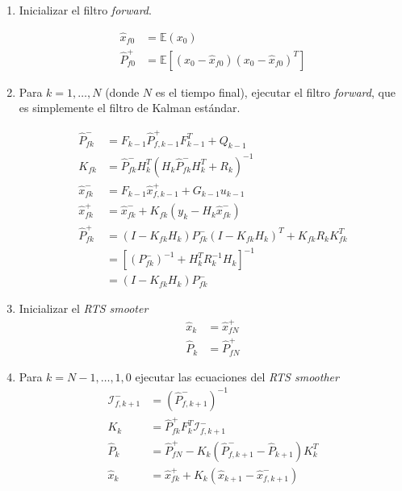 \begin{enumerate}
    \item Inicializar el filtro \textit{forward}.
    
    \[
    \begin{aligned}
    \hat{x}_{f0} &= \mathbb{E}(x_0) \\
    \hat{P}^{+}_{f0} &= \mathbb{E}\left[(x_0 - \hat{x}_{f0})(x_0 - \hat{x}_{f0})^{T}\right] 
    \end{aligned}
    \]
    
    \item Para \(k = 1, \dots, N\) (donde \(N\) es el tiempo final), ejecutar el filtro \textit{forward}, que es simplemente el filtro de Kalman estándar. 
    
    \[
    \begin{aligned}
    \hat{P}^{-}_{fk} &= F_{k-1}\hat{P}^{+}_{f,k-1}F_{k-1}^{T} + Q_{k-1} \\ 
    K_{fk} &= \hat{P}^{-}_{fk} H_k^{T} (H_k \hat{P}^{-}_{fk}H_k^{T} + R_k)^{-1}  \\
    \hat{x}^{-}_{fk} &= F_{k-1}\hat{x}^{+}_{f,k-1} + G_{k-1}u_{k-1} \\
    \hat{x}^{+}_{fk} &= \hat{x}^{-}_{fk} + K_{fk} \left(y_k - H_k \hat{x}^{-}_{fk} \right)\\ 
    \hat{P}^{+}_{fk} &= (I - K_{fk}H_k) P^{-}_{fk} (I-K_{fk}H_k)^{T} + K_{fk}R_{k}K_{fk}^{T} \\
    &= \left[ (P^{-}_{fk})^{-1} + H_k^{T} R_{k}^{-1}H_k\right]^{-1} \\ 
    &= (I - K_{fk}H_k)P^{-}_{fk}
    \end{aligned}
    \]
    
    \item Inicializar el \textit{RTS smooter} 
    \[
    \begin{aligned}
    \hat{x}_{k} &= \hat{x}^{+}_{fN} \\
    \hat{P}_k &= \hat{P}^{+}_{fN}
    \end{aligned}
    \]
    \item Para \(k = N-1, \dots, 1, 0\) ejecutar las ecuaciones del \textit{RTS smoother} 
    \[
    \begin{aligned}
    \mathcal{I}^{-}_{f, k+1} &= \left( \hat{P}^{-}_{f, k+1}\right)^{-1} \\
    K_k &= \hat{P}^{+}_{fk} F_{k}^{T} \mathcal{I}^{-}_{f, k+1} \\
    \hat{P}_k &= \hat{P}^{+}_{fN} - K_k (\hat{P}^{-}_{f, k+1} - \hat{P}_{k+1})K_k^{T} \\ 
    \hat{x}_k &= \hat{x}^{+}_{fk} + K_k(\hat{x}_{k+1} - \hat{x}^{-}_{f,k+1})
    \end{aligned}
    \]
\end{enumerate}



